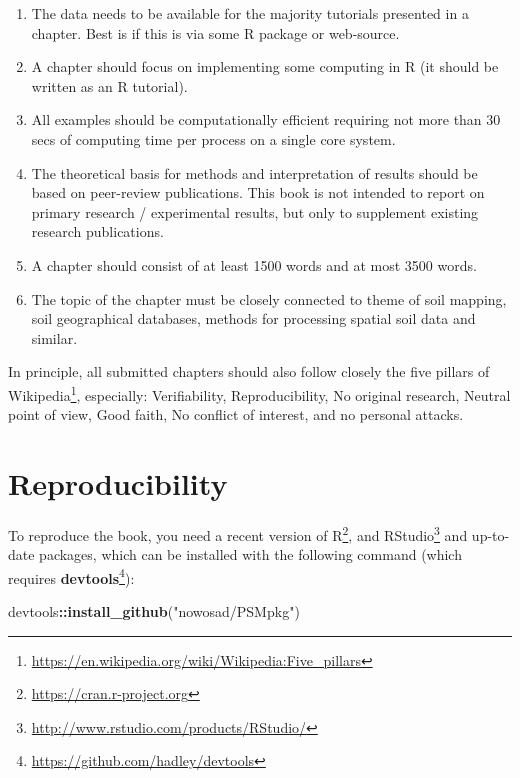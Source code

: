 \documentclass[graybox,natbib,nospthms,UStrade]{svmono}
\newenvironment{Shaded}{\begin{snugshade}}{\end{snugshade}}
\newcommand{\KeywordTok}[1]{\textcolor[rgb]{0.27,0.27,0.27}{\textbf{#1}}}
\newcommand{\NormalTok}[1]{#1}
\newcommand{\OperatorTok}[1]{\textcolor[rgb]{0.43,0.43,0.43}{\textbf{#1}}}
\newcommand{\StringTok}[1]{\textcolor[rgb]{0.5,0.5,0.5}{#1}}
\providecommand{\tightlist}{%
  \setlength{\itemsep}{0pt}\setlength{\parskip}{0pt}}
\providecommand{\tightlist}{\setlength{\itemsep}{0pt}\setlength{\parskip}{0pt}}
\renewcommand{\href}[2]{#2 (\url{#1})}
\renewcommand{\href}[2]{#2\footnote{\url{#1}}}
\begin{document}
\begin{enumerate}
\def\labelenumi{\arabic{enumi}.}
\tightlist
\item
  The data needs to be available for the majority tutorials presented in a chapter. Best is if this is via some R package or web-source.
\item
  A chapter should focus on implementing some computing in R (it should be written as an R tutorial).
\item
  All examples should be computationally efficient requiring not more than 30 secs of computing time per process on a single core system.
\item
  The theoretical basis for methods and interpretation of results should be based on peer-review publications. This book is not intended to report on primary research / experimental results, but only to supplement existing research publications.
\item
  A chapter should consist of at least 1500 words and at most 3500 words.
\item
  The topic of the chapter must be closely connected to theme of soil mapping, soil geographical databases, methods for processing spatial soil data and similar.
\end{enumerate}

In principle, all submitted chapters should also follow closely the \href{https://en.wikipedia.org/wiki/Wikipedia:Five_pillars}{five pillars of Wikipedia}, especially: Verifiability, Reproducibility, No original research, Neutral point of view, Good faith, No conflict of interest, and no personal attacks.

\hypertarget{reproducibility}{%
\section*{Reproducibility}\label{reproducibility}}

To reproduce the book, you need a recent version of \href{https://cran.r-project.org}{R}, and \href{http://www.rstudio.com/products/RStudio/}{RStudio} and up-to-date packages, which can be installed with the following command (which requires \href{https://github.com/hadley/devtools}{\textbf{devtools}}):

\begin{Shaded}
\begin{Highlighting}[]
\NormalTok{devtools}\OperatorTok{::}\KeywordTok{install_github}\NormalTok{(}\StringTok{"nowosad/PSMpkg"}\NormalTok{)}
\end{Highlighting}
\end{Shaded}
\end{document}
